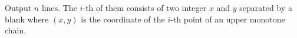 Output $n$ lines.
The $i$-th of them consists of two integer $x$ and $y$ separated by a blank
where $(x,y)$ is the coordinate of the $i$-th point of an upper monotone chain.
